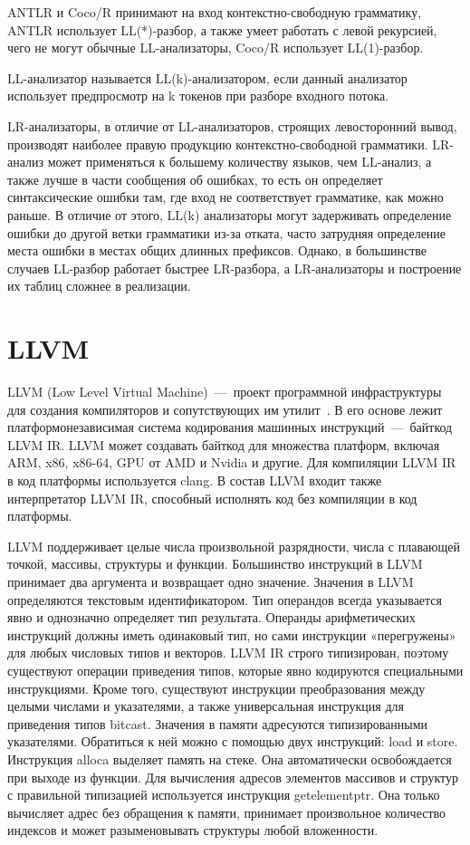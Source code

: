 ANTLR и Coco/R принимают на вход контекстно-свободную грамматику, ANTLR использует LL(*)-разбор, а также умеет работать с левой рекурсией, чего не могут
обычные LL-анализаторы, Coco/R использует LL(1)-разбор.

LL-анализатор называется LL(k)-анализатором, если данный анализатор использует предпросмотр на k токенов при разборе входного потока.

LR-анализаторы, в отличие от LL-анализаторов, строящих левосторонний вывод, производят наиболее правую продукцию контекстно-свободной грамматики.
LR-анализ может применяться к большему количеству языков, чем LL-анализ, а также лучше в части сообщения об ошибках, 
то есть он определяет синтаксические ошибки там, где вход не соответствует грамматике, как можно раньше. 
В отличие от этого, LL(k) анализаторы могут задерживать определение ошибки до другой ветки грамматики из-за отката, 
часто затрудняя определение места ошибки в местах общих длинных префиксов. Однако, в большинстве случаев LL-разбор работает быстрее LR-разбора,
а LR-анализаторы и построение их таблиц сложнее в реализации.

\section{LLVM}

LLVM (Low Level Virtual Machine)~---~проект программной инфраструктуры для создания компиляторов и сопутствующих им утилит~\cite{sarda2015llvm}. 
В его основе лежит платформонезависимая система кодирования машинных инструкций~---~байткод LLVM IR. 
LLVM может создавать байткод для множества платформ, включая ARM, x86, x86-64, GPU от AMD и Nvidia и другие. 
Для компиляции LLVM IR в код платформы используется clang. 
В состав LLVM входит также интерпретатор LLVM IR, способный исполнять код без компиляции в код платформы.

LLVM поддерживает целые числа произвольной разрядности, числа с плавающей точкой, массивы, структуры и функции. 
Большинство инструкций в LLVM принимает два аргумента и возвращает одно значение.
Значения в LLVM определяются текстовым идентификатором. 
Тип операндов всегда указывается явно и однозначно определяет тип результата. 
Операнды арифметических инструкций должны иметь одинаковый тип, но сами инструкции «перегружены» для любых числовых типов и векторов.
LLVM IR строго типизирован, поэтому существуют операции приведения типов, которые явно кодируются специальными инструкциями. 
Кроме того, существуют инструкции преобразования между целыми числами и указателями, а также универсальная инструкция для приведения типов bitcast.
Значения в памяти адресуются типизированными указателями. 
Обратиться к ней можно с помощью двух инструкций: load и store. Инструкция alloca выделяет память на стеке. 
Она автоматически освобождается при выходе из функции.
Для вычисления адресов элементов массивов и структур с правильной типизацией используется инструкция getelementptr. 
Она только вычисляет адрес без обращения к памяти, принимает произвольное количество индексов и может разыменовывать структуры любой вложенности.

